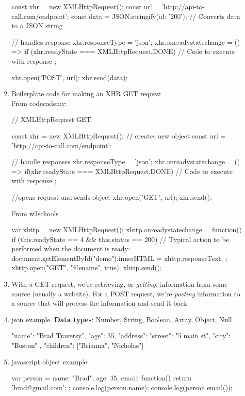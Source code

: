 \documentclass[a4paper,12pt]{article}
\begin{document}
\begin{enumerate}
\begin{jscode}
const xhr = new XMLHttpRequest();
const url = 'http://api-to-call.com/endpoint';
const data = JSON.stringify({id: '200'});  // Converts data to a JSON string

// handles response
xhr.responseType = 'json';
xhr.onreadystatechange = () => {
  if (xhr.readyState === XMLHttpRequest.DONE){
    // Code to execute with response
  }
};

xhr.open('POST', url);
xhr.send(data);
\end{jscode}

\item Boilerplate code for making an XHR GET request\\
From codecademy:
\begin{jscode}
// XMLHttpRequest GET

const xhr = new XMLHttpRequest(); // creates new object
const url = 'http://api-to-call.com/endpoint';

// handle responses
xhr.responseType = 'json';
xhr.onreadystatechange = () => {
  if(xhr.readyState === XMLHttpRequest.DONE){
    // Code to execute with response
  }
};

//opens request and sends object
xhr.open('GET', url);
xhr.send();
\end{jscode}
From w3schools
\begin{jscode}
var xhttp = new XMLHttpRequest();
xhttp.onreadystatechange = function() {
    if (this.readyState == 4 && this.status == 200) {
       // Typical action to be performed when the document is ready:
       document.getElementById("demo").innerHTML = xhttp.responseText;
    }
};
xhttp.open("GET", "filename", true);
xhttp.send();
\end{jscode}

\item With a GET request, we're retrieving, or \textit{getting}, information from some source (usually a website). For a POST request, we're \textit{posting} information to a source that will process the information and send it back

\item json example. \textbf{Data types}: Number, String, Boolean, Array, Object, Null
\begin{jscode}
{
	"name": "Brad Traversy",
	"age": 35,
	"address": {
		"street": "5 main st",
		"city": "Boston"
	},
	"children": ["Brianna", "Nicholas"]
}
\end{jscode}

\item javascript object example
\begin{jscode}
var person = {
  name: "Brad",
  age: 35,
  email: function(){
    return 'brad@gmail.com';
  }
};
console.log(person.name);
console.log(person.email());
\end{jscode}


\end{enumerate}
\end{document}

